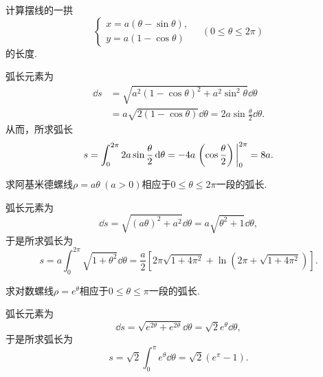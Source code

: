 \begin{example}
计算摆线的一拱\begin{equation*}
	\left\{ \begin{array}{l}
		x = a (\theta - \sin\theta), \\
		y = a (1 - \cos\theta)
	\end{array} \right.
	\quad(0 \leq \theta \leq 2\pi)
\end{equation*}的长度.
\begin{solution}
弧长元素为\begin{align*}
	\dd{s} &= \sqrt{a^2 (1 - \cos\theta)^2 + a^2 \sin^2\theta} \dd{\theta} \\
	&= a \sqrt{2 (1 - \cos\theta)} \dd{\theta}
	= 2 a \sin\frac\theta2 \dd{\theta}.
\end{align*}
从而，所求弧长\begin{equation*}
	s = \int_0^{2\pi} 2a \sin\frac\theta2 \dd{\theta}
	= -4a \eval{\left(\cos\frac\theta2\right)}_0^{2\pi}
	= 8a.
\end{equation*}
\end{solution}
\end{example}

\begin{example}
求阿基米德螺线\(\rho=a\theta\ (a>0)\)相应于\(0\leq\theta\leq2\pi\)一段的弧长.
\begin{solution}
弧长元素为\begin{equation*}
	\dd{s} = \sqrt{(a\theta)^2 + a^2} \dd{\theta}
	= a\sqrt{\theta^2+1} \dd{\theta},
\end{equation*}
于是所求弧长为\begin{equation*}
	s = a \int_0^{2\pi} \sqrt{1+\theta^2} \dd{\theta}
	= \frac{a}{2} \left[
	2\pi\sqrt{1+4\pi^2} + \ln(2\pi+\sqrt{1+4\pi^2})
	\right].
\end{equation*}
\end{solution}
\end{example}

\begin{example}
求对数螺线\(\rho=e^{\theta}\)相应于\(0\leq\theta\leq\pi\)一段的弧长.
\begin{solution}
弧长元素为\begin{equation*}
	\dd{s} = \sqrt{e^{2\theta}+e^{2\theta}} \dd{\theta}
	= \sqrt{2}e^{\theta} \dd{\theta},
\end{equation*}
于是所求弧长为\begin{equation*}
	s = \sqrt{2} \int_0^\pi e^{\theta} \dd{\theta}
	= \sqrt{2} (e^\pi-1).
\end{equation*}
\end{solution}
\end{example}


